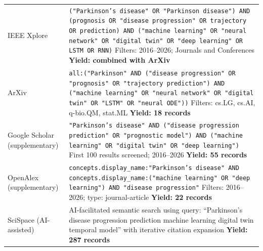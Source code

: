 \documentclass[11pt,a4paper]{article}
\begin{document}
\begin{small}
\begin{longtable}{@{}p{2.5cm}p{12cm}@{}}
\addlinespace
IEEE Xplore & \texttt{("Parkinson's disease" OR "Parkinson disease") AND (prognosis OR "disease progression" OR trajectory OR prediction) AND ("machine learning" OR "neural network" OR "digital twin" OR "deep learning" OR LSTM OR RNN)} \newline Filters: 2016--2026; Journals and Conferences \newline \textbf{Yield: combined with ArXiv} \\
\addlinespace
ArXiv & \texttt{all:("Parkinson" AND ("disease progression" OR "prognosis" OR "trajectory prediction") AND ("machine learning" OR "neural network" OR "digital twin" OR "LSTM" OR "neural ODE"))} \newline Filters: cs.LG, cs.AI, q-bio.QM, stat.ML \newline \textbf{Yield: 18 records} \\
\addlinespace
Google Scholar (supplementary) & \texttt{"Parkinson's disease" AND ("disease progression prediction" OR "prognostic model") AND ("machine learning" OR "digital twin" OR "deep learning")} \newline First 100 results screened; 2016--2026 \newline \textbf{Yield: 55 records} \\
\addlinespace
OpenAlex (supplementary) & \texttt{concepts.display\_name:"Parkinson's disease" AND concepts.display\_name:("machine learning" OR "deep learning") AND "disease progression"} \newline Filters: 2016--2026; type: journal-article \newline \textbf{Yield: 22 records} \\
\addlinespace
SciSpace (AI-assisted) & AI-facilitated semantic search using query: ``Parkinson's disease progression prediction machine learning digital twin temporal model'' with iterative citation expansion \newline \textbf{Yield: 287 records} \\
\end{longtable}
\end{small}
\end{document}
